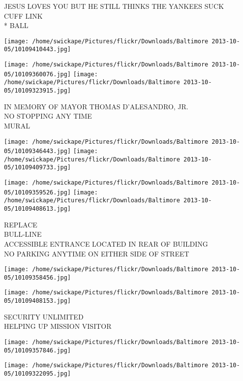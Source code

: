 \documentclass[10pt,letterpaper]{article}
\begin{document}
JESUS LOVES YOU BUT HE STILL THINKS THE YANKEES SUCK\\
CUFF LINK\\
* BALL\\
\pagebreak

\texttt{[image: /home/swickape/Pictures/flickr/Downloads/Baltimore 2013-10-05/10109410443.jpg]}

\vspace{0.25in}
\texttt{[image: /home/swickape/Pictures/flickr/Downloads/Baltimore 2013-10-05/10109360076.jpg]}
\texttt{[image: /home/swickape/Pictures/flickr/Downloads/Baltimore 2013-10-05/10109323915.jpg]}

IN MEMORY OF MAYOR THOMAS D'ALESANDRO, JR.\\
NO STOPPING ANY TIME\\
MURAL\\
\pagebreak

\texttt{[image: /home/swickape/Pictures/flickr/Downloads/Baltimore 2013-10-05/10109346443.jpg]}
\texttt{[image: /home/swickape/Pictures/flickr/Downloads/Baltimore 2013-10-05/10109409733.jpg]}

\texttt{[image: /home/swickape/Pictures/flickr/Downloads/Baltimore 2013-10-05/10109359526.jpg]}
\texttt{[image: /home/swickape/Pictures/flickr/Downloads/Baltimore 2013-10-05/10109408613.jpg]}

REPLACE\\
BULL{-}LINE\\
ACCESSIBLE ENTRANCE LOCATED IN REAR OF BUILDING\\
NO PARKING ANYTIME ON EITHER SIDE OF STREET\\
\pagebreak

\texttt{[image: /home/swickape/Pictures/flickr/Downloads/Baltimore 2013-10-05/10109358456.jpg]}

\vspace{0.25in}
\texttt{[image: /home/swickape/Pictures/flickr/Downloads/Baltimore 2013-10-05/10109408153.jpg]}

SECURITY UNLIMITED\\
HELPING UP MISSION VISITOR\\
\pagebreak

\texttt{[image: /home/swickape/Pictures/flickr/Downloads/Baltimore 2013-10-05/10109357846.jpg]}

\vspace{0.25in}
\texttt{[image: /home/swickape/Pictures/flickr/Downloads/Baltimore 2013-10-05/10109322095.jpg]}
\end{document}
